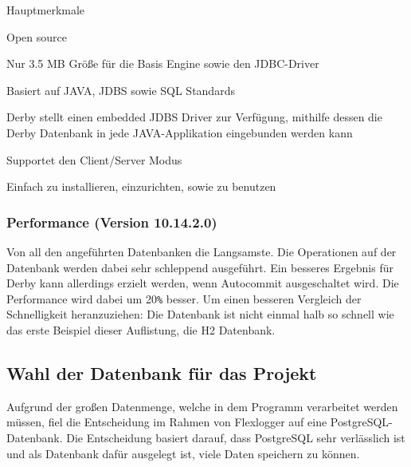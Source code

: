 \begin{compactitem}
    \item [Hauptmerkmale]
    \item Open source
    \item Nur 3.5 MB Größe für die Basis Engine sowie den JDBC-Driver        
    \item Basiert auf JAVA, JDBS sowie SQL Standards
    \item Derby stellt einen embedded JDBS Driver zur Verfügung, mithilfe dessen die Derby Datenbank in jede JAVA-Applikation eingebunden werden kann
    \item Supportet den Client/Server Modus
    \item Einfach zu installieren, einzurichten, sowie zu benutzen
\end{compactitem}
\cite{ApacheDerbyOfficialSite}
 

\subsubsection{Performance (Version 10.14.2.0)}
Von all den angeführten Datenbanken die Langsamste. Die Operationen auf der Datenbank werden dabei sehr schleppend ausgeführt. Ein besseres Ergebnis für Derby kann allerdings erzielt werden, wenn Autocommit ausgeschaltet wird. Die Performance wird dabei um 20\texttt{\%} besser. Um einen besseren Vergleich der Schnelligkeit heranzuziehen: Die Datenbank ist nicht einmal halb so schnell wie das erste Beispiel dieser Auflistung, die H2 Datenbank. \cite{databaseComparison}

\subsection{Wahl der Datenbank für das Projekt}
Aufgrund der großen Datenmenge, welche in dem Programm verarbeitet werden müssen, fiel die Entscheidung im Rahmen von Flexlogger auf eine PostgreSQL-Datenbank. Die Entscheidung basiert darauf, dass PostgreSQL sehr verlässlich ist und als Datenbank dafür ausgelegt ist, viele Daten speichern zu können.
